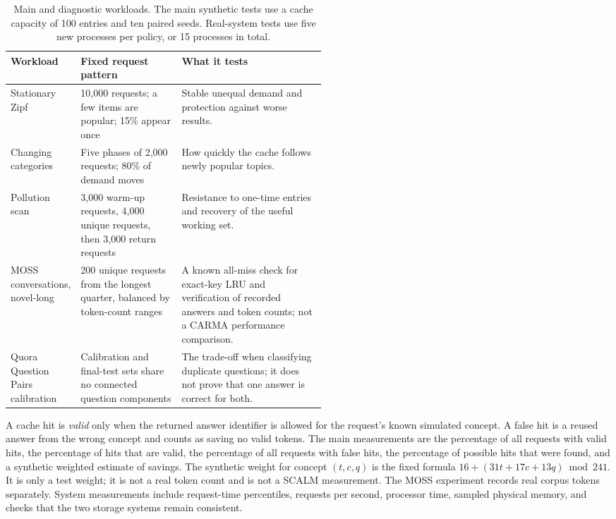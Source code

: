 \documentclass[10pt,letterpaper]{article}
\begin{document}
\begin{table}[ht]
\centering
\begin{tabularx}{\linewidth}{@{}L{0.20\linewidth}L{0.32\linewidth}Y@{}}
\toprule
Workload & Fixed request pattern & What it tests \\
\midrule
Stationary Zipf & 10,000 requests; a few items are popular; 15\% appear once &
Stable unequal demand and protection against worse results. \\
Changing categories & Five phases of 2,000 requests; 80\% of demand moves &
How quickly the cache follows newly popular topics. \\
Pollution scan & 3,000 warm-up requests, 4,000 unique requests, then 3,000
return requests & Resistance to one-time entries and recovery of the useful
working set. \\
MOSS conversations, novel-long & 200 unique requests from the longest quarter,
balanced by token-count ranges & A known all-miss check for exact-key LRU and
verification of recorded answers and token counts; not a CARMA performance
comparison. \\
Quora Question Pairs calibration & Calibration and final-test sets share no
connected question components & The trade-off when classifying duplicate
questions; it does not prove that one answer is correct for both. \\
\bottomrule
\end{tabularx}
\caption{Main and diagnostic workloads. The main synthetic tests use a cache
capacity of 100 entries and ten paired seeds. Real-system tests use five new processes
per policy, or 15 processes in total.}
\end{table}

A cache hit is \emph{valid} only when the returned answer identifier is allowed
for the request's known simulated concept. A false hit is a reused answer from
the wrong concept and counts as saving no valid tokens. The main measurements
are the percentage of all requests with valid hits, the percentage of hits
that are valid, the percentage of all requests with false hits, the percentage
of possible hits that were found, and a synthetic weighted estimate of
savings. The synthetic weight for concept $(t,c,q)$ is the fixed formula
$16+(31t+17c+13q)\bmod 241$. It is only a test weight; it is not a real token
count and is not a SCALM measurement. The MOSS experiment records real corpus
tokens separately. System measurements include request-time percentiles,
requests per second, processor time, sampled physical memory, and checks that
the two storage systems remain consistent.
\end{document}
